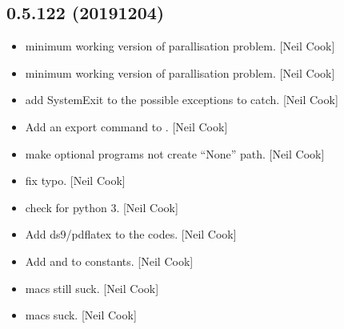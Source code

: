 \documentclass[a4paper,10pt,english]{report}
\begin{document}
\subsection{0.5.122 (2019\sphinxhyphen{}12\sphinxhyphen{}04)}
\label{\detokenize{misc/changelog:id40}}\begin{itemize}
\item {} 
 \sphinxhyphen{} minimum working version of
parallisation problem. {[}Neil Cook{]}

\item {} 
 \sphinxhyphen{} minimum working version of
parallisation problem. {[}Neil Cook{]}

\item {} 
 \sphinxhyphen{} add SystemExit to the possible exceptions
to catch. {[}Neil Cook{]}

\item {} 
Add an export command to . {[}Neil Cook{]}

\item {} 
 \sphinxhyphen{} make optional programs not
create “None” path. {[}Neil Cook{]}

\item {} 
 \sphinxhyphen{} fix typo. {[}Neil Cook{]}

\item {} 
 \sphinxhyphen{} check for python 3. {[}Neil Cook{]}

\item {} 
Add ds9/pdflatex to the codes. {[}Neil Cook{]}

\item {} 
Add  and  to constants. {[}Neil Cook{]}

\item {} 
 \sphinxhyphen{} macs still suck. {[}Neil Cook{]}

\item {} 
 \sphinxhyphen{} macs suck. {[}Neil Cook{]}

\end{itemize}
\end{document}
